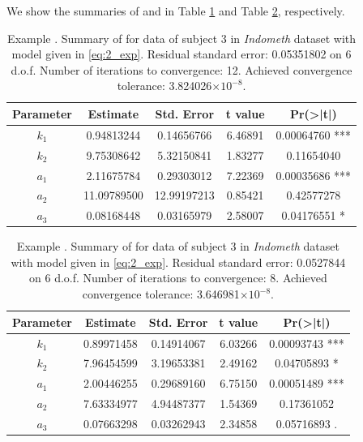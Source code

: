 We show the summaries of  and  in Table \ref{t:two_exponential_summary_TAC} and Table \ref{t:two_exponentials_summary_NLS_best_approximation}, respectively.

\begin{table}[htb]
\centering
\begin{tabular}{ccccc}
\toprule
Parameter &  Estimate & Std. Error & t value & Pr(>|t|)\\    
\midrule     
$k_1$ & 0.94813244 & 0.14656766 & 6.46891 & 0.00064760 ***\\
$k_2$ & 9.75308642 &  5.32150841 & 1.83277 & 0.11654040 \\
$a_1$ & 2.11675784  & 0.29303012 & 7.22369 & 0.00035686 ***\\
$a_2$ & 11.09789500 & 12.99197213 & 0.85421 & 0.42577278\\
$a_3$ & 0.08168448  & 0.03165979 & 2.58007 & 0.04176551 * \\
\bottomrule
\end{tabular} 
\caption{Example . Summary of  for data of subject 3 in \textit{Indometh} dataset with model given in \eqref{eq:2_exp}. Residual standard error: 0.05351802 on 6 d.o.f. Number of iterations to convergence: 12. Achieved convergence tolerance:  3.824026$\times 10^{-8}$.}
\label{t:two_exponential_summary_TAC}
\end{table}




\begin{table}[htb]
\centering
\begin{tabular}{ccccc}
\toprule
Parameter &  Estimate & Std. Error & t value & Pr(>|t|)\\    
\midrule    
$k_1$  & 0.89971458 & 0.14914067 & 6.03266 & 0.00093743 ***\\
$k_2$ & 7.96454599 & 3.19653381 & 2.49162 & 0.04705893 *  \\
$a_1$ & 2.00446255 & 0.29689160 & 6.75150 & 0.00051489 ***\\
$a_2$ & 7.63334977 & 4.94487377 & 1.54369 & 0.17361052    \\
$a_3$ & 0.07663298 & 0.03262943 & 2.34858 & 0.05716893 .  \\
\bottomrule
\end{tabular} 
\caption{Example . Summary of  for data of subject 3 in \textit{Indometh} dataset with model given in \eqref{eq:2_exp}. Residual standard error: 0.0527844 on 6 d.o.f. Number of iterations to convergence: 8. Achieved convergence tolerance:  3.646981$\times 10^{-8}$.}
\label{t:two_exponentials_summary_NLS_best_approximation}
\end{table}




